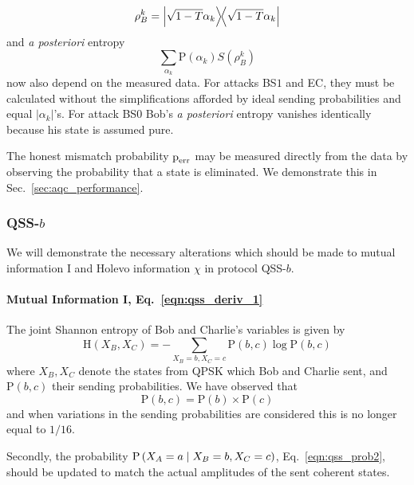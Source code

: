 \begin{equation}
\rho_B^k = \dyad{\sqrt{1-T}\alpha_k}
\end{equation} 
and \emph{a posteriori} entropy
\begin{equation}
\sum_{\alpha_k}\text{P}\left(\alpha_k\right) S\left(\rho_B^k\right)
\end{equation}
now also depend on the measured data. For attacks BS$1$ and EC, they must be calculated without the simplifications afforded by ideal sending probabilities and equal $\left|\alpha_k\right|$'s. For attack BS$0$ Bob's \emph{a posteriori} entropy vanishes identically because his state is assumed pure.

The honest mismatch probability $\text{p}_{\text{err}}$ may be measured directly from the data by observing the probability that a state is eliminated. We demonstrate this in Sec.~\ref{sec:aqc_performance}.


\subsubsection{QSS-$b$}
We will demonstrate the necessary alterations which should be made to mutual information I and Holevo information $\chi$ in protocol QSS-$b$.

\paragraph{Mutual Information I, Eq.~\ref{eqn:qss_deriv_1}}
The joint Shannon entropy of Bob and Charlie's variables is given by
\begin{equation}
\text{H}\left(X_B, X_C\right) = - \sum_{X_B=b, X_C=c} \text{P}\left(b, c\right) \log \text{P}\left(b, c\right)
\end{equation}
where $X_B, X_C$ denote the states from QPSK which Bob and Charlie sent, and $\text{P}\left(b, c\right)$ their sending probabilities. We have observed that
\begin{equation}
\text{P}\left(b, c\right) = \text{P}\left(b\right) \times \text{P}\left(c\right)
\end{equation}
and when variations in the sending probabilities are considered this is no longer equal to $1/16$. 

Secondly, the probability $\text{P}\left(X_A=a \; \middle| \; X_B=b, X_C=c\right)$, Eq.~\ref{eqn:qss_prob2}, should be updated to match the actual amplitudes of the sent coherent states.

